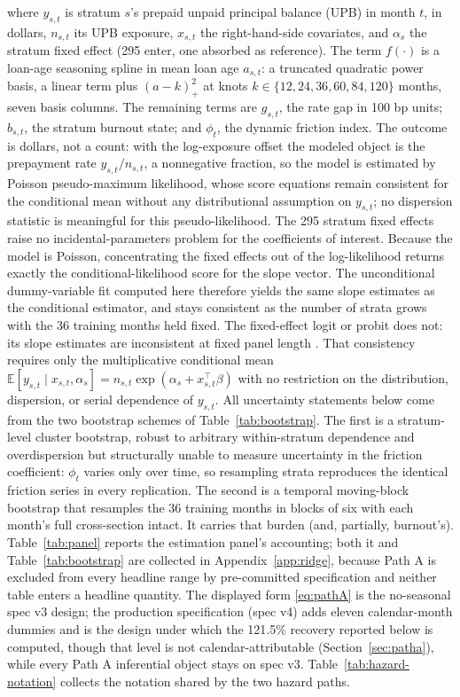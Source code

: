 \documentclass[12pt]{article}
\begin{document}
where $y_{s,t}$ is stratum $s$'s prepaid unpaid principal balance (UPB) in month $t$, in dollars, $n_{s,t}$ its UPB exposure, $x_{s,t}$ the right-hand-side covariates, and $\alpha_{s}$ the stratum fixed effect (295 enter, one absorbed as reference). The term $f(\cdot)$ is a loan-age seasoning spline in mean loan age $a_{s,t}$: a truncated quadratic power basis, a linear term plus $(a - k)_+^2$ at knots $k \in \{12, 24, 36, 60, 84, 120\}$ months, seven basis columns. The remaining terms are $g_{s,t}$, the rate gap in 100 bp units; $b_{s,t}$, the stratum burnout state; and $\phi_t$, the dynamic friction index. The outcome is dollars, not a count: with the log-exposure offset the modeled object is the prepayment rate $y_{s,t}/n_{s,t}$, a nonnegative fraction, so the model is estimated by Poisson pseudo-maximum likelihood, whose score equations remain consistent for the conditional mean without any distributional assumption on $y_{s,t}$; no dispersion statistic is meaningful for this pseudo-likelihood. The 295 stratum fixed effects raise no incidental-parameters problem for the coefficients of interest. Because the model is Poisson, concentrating the fixed effects out of the log-likelihood returns exactly the conditional-likelihood score for the slope vector. The unconditional dummy-variable fit computed here therefore yields the same slope estimates as the conditional estimator, and stays consistent as the number of strata grows with the 36 training months held fixed. The fixed-effect logit or probit does not: its slope estimates are inconsistent at fixed panel length \citep{wooldridge1999}. That consistency requires only the multiplicative conditional mean $\mathbb{E}[y_{s,t}\mid x_{s,t},\alpha_{s}] = n_{s,t}\exp(\alpha_{s} + x_{s,t}^{\top}\beta)$ with no restriction on the distribution, dispersion, or serial dependence of $y_{s,t}$. All uncertainty statements below come from the two bootstrap schemes of Table~\ref{tab:bootstrap}. The first is a stratum-level cluster bootstrap, robust to arbitrary within-stratum dependence and overdispersion but structurally unable to measure uncertainty in the friction coefficient: $\phi_t$ varies only over time, so resampling strata reproduces the identical friction series in every replication. The second is a temporal moving-block bootstrap that resamples the 36 training months in blocks of six with each month's full cross-section intact. It carries that burden (and, partially, burnout's). Table~\ref{tab:panel} reports the estimation panel's accounting; both it and Table~\ref{tab:bootstrap} are collected in Appendix~\ref{app:ridge}, because Path A is excluded from every headline range by pre-committed specification and neither table enters a headline quantity. The displayed form \eqref{eq:pathA} is the no-seasonal spec v3 design; the production specification (spec v4) adds eleven calendar-month dummies and is the design under which the 121.5\% recovery reported below is computed, though that level is not calendar-attributable (Section~\ref{sec:patha}), while every Path A inferential object stays on spec v3. Table~\ref{tab:hazard-notation} collects the notation shared by the two hazard paths.
\end{document}
